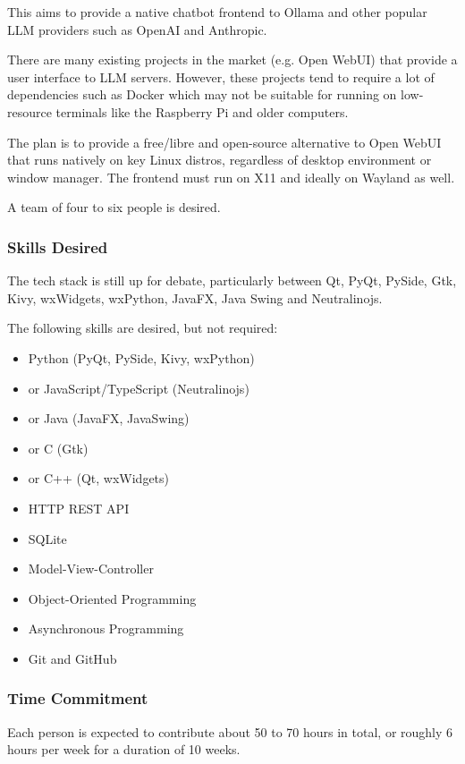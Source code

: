 \documentclass[11pt,fleqn]{article}
\begin{document}
This aims to provide a native chatbot frontend to Ollama and other popular LLM providers such as OpenAI and Anthropic.

There are many existing projects in the market (e.g. Open WebUI) that provide a user interface to LLM servers.  However, these projects tend to require a lot of dependencies such as Docker which may not be suitable for running on low-resource terminals like the Raspberry Pi and older computers.

The plan is to provide a free/libre and open-source alternative to Open WebUI that runs natively on key Linux distros, regardless of desktop environment or window manager.  The frontend must run on X11 and ideally on Wayland as well.

A team of four to six people is desired.

\subsubsection*{Skills Desired}

The tech stack is still up for debate, particularly between Qt, PyQt, PySide, Gtk, Kivy, wxWidgets, wxPython, JavaFX, Java Swing and Neutralinojs.

The following skills are desired, but not required:

\begin{itemize}
    \item Python (PyQt, PySide, Kivy, wxPython)
    \item or JavaScript/TypeScript (Neutralinojs)
    \item or Java (JavaFX, JavaSwing)
    \item or C (Gtk)
    \item or C++ (Qt, wxWidgets)
    \item HTTP REST API
    \item SQLite
    \item Model-View-Controller
    \item Object-Oriented Programming
    \item Asynchronous Programming
    \item Git and GitHub
\end{itemize}

\subsubsection*{Time Commitment}

Each person is expected to contribute about 50 to 70 hours in total, or roughly 6 hours per week for a duration of 10 weeks.
\end{document}
